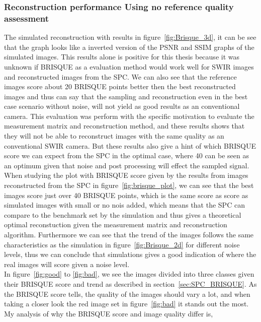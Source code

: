 \subsubsection{Reconstruction performance Using no reference quality assessment}
The simulated reconstruction with results in figure~\ref{fig:Brisque_3d}, it can be see that the graph looks like a inverted version of the PSNR and SSIM graphs of the simulated images. This results alone is positive for this thesis because it was unknown if BRISQUE as a evaluation method would work well for SWIR images and  reconstructed images from the SPC. We can also see that the reference images score about 20 BRISQUE points better then the best reconstructed images and thus can say that the sampling and reconstruction even in the best case scenario without noise, will not yield as good results as an conventional camera. This evaluation was perform with the specific motivation to evaluate the measurement matrix and reconstruction method, and these results shows that they will not be able to reconstruct images with the same quality as an conventional SWIR camera. But these results also give a hint of which BRISQUE score we can expect from the SPC in the optimal case, where 40 can be seen as an optimum given that noise and post processing will effect the sampled signal.\\[0.1in]


When studying the plot with BRISQUE score given by the results from images reconstructed from the SPC in figure~\ref{fig:brisque_plot}, we can see that the best images score just over 40 BRISQUE points, which is the same score as score as simulated images with small or no nois added, which means that the SPC can compare to the benchmark set by the simulation and thus gives a theoretical optimal reconstuction given the measurement matrix and reconstruction algorithm. Furthermore we can see that the trend of the images follows the same characteristics as the simulation in figure~\ref{fig:Brisque_2d} for different noise levels, thus we can conclude that simulations gives a good indication of where the real images will score given a noise level.\\[0.1in]

In figure~\ref{fig:good} to \ref{fig:bad}, we see the images divided into three classes given their BRISQUE score and trend as described in section~\ref{sec:SPC_BRISQUE}. As the BRISQUE score tells, the quality of the images should vary a lot, and when taking a closer look the red image set in figure~\ref{fig:bad} it stands out the most. My analysis of why the BRISQUE score and image quality differ is, 

